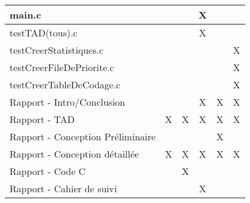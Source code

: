 \begin{table}[h]
\begin{tabular}{l|c|c|c|c|c|}
\multicolumn{1}{|l|}{main.c}                            &                       &               & X                       &                       &                        \\ \hline
\multicolumn{1}{|l|}{testTAD(tous).c}             &                       &                & X                      &                      &                        \\ \hline
\multicolumn{1}{|l|}{testCreerStatistiques.c}          &                       &               &                       &                       & X                       \\ \hline
\multicolumn{1}{|l|}{testCreerFileDePriorite.c}       &                       &                &                       &                      & X                       \\ \hline
\multicolumn{1}{|l|}{testCreerTableDeCodage.c}           &                       &                &                       &                       & X                      \\ \hline
\multicolumn{1}{|l|}{Rapport - Intro/Conclusion}        &                       &                & X                      & X                       & X                      \\ \hline
\multicolumn{1}{|l|}{Rapport - TAD}                     & X                     & X              & X                     & X                     & X                      \\ \hline
\multicolumn{1}{|l|}{Rapport - Conception Préliminaire} &                       &               &                      & X                     &                        \\ \hline
\multicolumn{1}{|l|}{Rapport - Conception détaillée}    & X                     & X              & X                     & X                     & X                      \\ \hline
\multicolumn{1}{|l|}{Rapport - Code C}                  &                      & X               &                       &                       &                        \\ \hline
\multicolumn{1}{|l|}{Rapport - Cahier de suivi}         &                       &               & X                      &                       &                        \\ \hline
\end{tabular}
\end{table}
